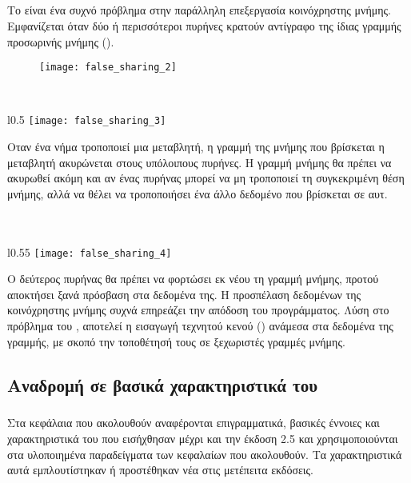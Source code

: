 \paragraph{}
\subparagraph{}
Το \emph{} είναι ένα συχνό πρόβλημα στην παράλληλη επεξεργασία κοινόχρηστης μνήμης. Εμφανίζεται όταν δύο ή περισσότεροι πυρήνες κρατούν αντίγραφο της ίδιας γραμμής προσωρινής μνήμης (\emph{}). 

\begin{figure}[h]
\texttt{[image: false\_sharing\_2]}
\centering
\captionsetup{justification=centering, singlelinecheck=false}
	\caption{}
\label{fig:false_sharing_2}
\end{figure}

\ \\
\begin{wrapfigure}{l}{0.5\textwidth}
	\centering
	\texttt{[image: false\_sharing\_3]}
	\captionsetup{justification=centering, singlelinecheck=false}
	\caption{}
\label{fig:false_sharing_3}
\end{wrapfigure}

Οταν ένα νήμα τροποποιεί μια μεταβλητή, η γραμμή της μνήμης που βρίσκεται η μεταβλητή ακυρώνεται στους υπόλοιπους πυρήνες. Η γραμμή μνήμης θα πρέπει να ακυρωθεί ακόμη και αν ένας πυρήνας μπορεί να μη τροποποιεί τη συγκεκριμένη θέση μνήμης, αλλά να θέλει να τροποποιήσει ένα άλλο δεδομένο που βρίσκεται σε αυτ. 
\ \\
\ \\
\ \\
\begin{wrapfigure}{l}{0.55\textwidth}
	\centering
	\texttt{[image: false\_sharing\_4]}
	\captionsetup{justification=centering, singlelinecheck=false}
	\caption{}
\label{fig:false_sharing_4}
\end{wrapfigure}

Ο δεύτερος πυρήνας θα πρέπει να φορτώσει εκ νέου τη γραμμή μνήμης, προτού αποκτήσει ξανά πρόσβαση στα δεδομένα της. Η προσπέλαση δεδομένων της κοινόχρηστης μνήμης συχνά επηρεάζει την απόδοση του προγράμματος\cite{false_sharing}.
Λύση στο πρόβλημα του , αποτελεί η εισαγωγή τεχνητού κενού () ανάμεσα στα δεδομένα της γραμμής, με σκοπό την τοποθέτησή τους σε ξεχωριστές γραμμές μνήμης.
\clearpage
\subsection{Αναδρομή σε βασικά χαρακτηριστικά του \emph{}}
\subparagraph{}
Στα κεφάλαια που ακολουθούν αναφέρονται επιγραμματικά, βασικές έννοιες και χαρακτηριστικά του \emph{} που εισήχθησαν μέχρι και την έκδοση 2.5 και χρησιμοποιούνται στα υλοποιημένα παραδείγματα των κεφαλαίων που ακολουθούν. Τα χαρακτηριστικά αυτά εμπλουτίστηκαν ή προστέθηκαν νέα στις μετέπειτα εκδόσεις.

